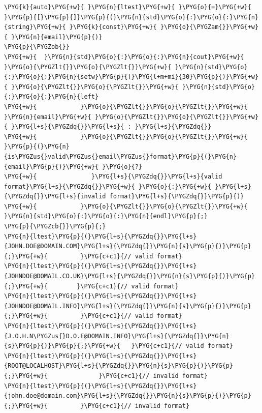 
\begin{codeblockbg}
\begin{Verbatim}[commandchars=\\\{\},breaklines=true,breakanywhere=true,fontsize=\codefont,xleftmargin=17bp]
\PYG{k}{auto}\PYG{+w}{ }\PYG{n}{ltest}\PYG{+w}{ }\PYG{o}{=}\PYG{+w}{ }\PYG{p}{[}\PYG{p}{]}\PYG{p}{(}\PYG{n}{std}\PYG{o}{:}\PYG{o}{:}\PYG{n}{string}\PYG{+w}{ }\PYG{k}{const}\PYG{+w}{ }\PYG{o}{\PYGZam{}}\PYG{+w}{ }\PYG{n}{email}\PYG{p}{)}
\PYG{p}{\PYGZob{}}
\PYG{+w}{  }\PYG{n}{std}\PYG{o}{:}\PYG{o}{:}\PYG{n}{cout}\PYG{+w}{ }\PYG{o}{\PYGZlt{}}\PYG{o}{\PYGZlt{}}\PYG{+w}{ }\PYG{n}{std}\PYG{o}{:}\PYG{o}{:}\PYG{n}{setw}\PYG{p}{(}\PYG{l+m+mi}{30}\PYG{p}{)}\PYG{+w}{ }\PYG{o}{\PYGZlt{}}\PYG{o}{\PYGZlt{}}\PYG{+w}{ }\PYG{n}{std}\PYG{o}{:}\PYG{o}{:}\PYG{n}{left}
\PYG{+w}{            }\PYG{o}{\PYGZlt{}}\PYG{o}{\PYGZlt{}}\PYG{+w}{ }\PYG{n}{email}\PYG{+w}{ }\PYG{o}{\PYGZlt{}}\PYG{o}{\PYGZlt{}}\PYG{+w}{ }\PYG{l+s}{\PYGZdq{}}\PYG{l+s}{ : }\PYG{l+s}{\PYGZdq{}}
\PYG{+w}{            }\PYG{o}{\PYGZlt{}}\PYG{o}{\PYGZlt{}}\PYG{+w}{ }\PYG{p}{(}\PYG{n}{is\PYGZus{}valid\PYGZus{}email\PYGZus{}format}\PYG{p}{(}\PYG{n}{email}\PYG{p}{)}\PYG{+w}{ }\PYG{o}{?}
\PYG{+w}{               }\PYG{l+s}{\PYGZdq{}}\PYG{l+s}{valid format}\PYG{l+s}{\PYGZdq{}}\PYG{+w}{ }\PYG{o}{:}\PYG{+w}{ }\PYG{l+s}{\PYGZdq{}}\PYG{l+s}{invalid format}\PYG{l+s}{\PYGZdq{}}\PYG{p}{)}
\PYG{+w}{            }\PYG{o}{\PYGZlt{}}\PYG{o}{\PYGZlt{}}\PYG{+w}{ }\PYG{n}{std}\PYG{o}{:}\PYG{o}{:}\PYG{n}{endl}\PYG{p}{;}
\PYG{p}{\PYGZcb{}}\PYG{p}{;}
\PYG{n}{ltest}\PYG{p}{(}\PYG{l+s}{\PYGZdq{}}\PYG{l+s}{JOHN.DOE@DOMAIN.COM}\PYG{l+s}{\PYGZdq{}}\PYG{n}{s}\PYG{p}{)}\PYG{p}{;}\PYG{+w}{         }\PYG{c+c1}{// valid format}
\PYG{n}{ltest}\PYG{p}{(}\PYG{l+s}{\PYGZdq{}}\PYG{l+s}{JOHNDOE@DOMAIL.CO.UK}\PYG{l+s}{\PYGZdq{}}\PYG{n}{s}\PYG{p}{)}\PYG{p}{;}\PYG{+w}{        }\PYG{c+c1}{// valid format}
\PYG{n}{ltest}\PYG{p}{(}\PYG{l+s}{\PYGZdq{}}\PYG{l+s}{JOHNDOE@DOMAIL.INFO}\PYG{l+s}{\PYGZdq{}}\PYG{n}{s}\PYG{p}{)}\PYG{p}{;}\PYG{+w}{         }\PYG{c+c1}{// valid format}
\PYG{n}{ltest}\PYG{p}{(}\PYG{l+s}{\PYGZdq{}}\PYG{l+s}{J.O.H.N\PYGZus{}D.O.E@DOMAIN.INFO}\PYG{l+s}{\PYGZdq{}}\PYG{n}{s}\PYG{p}{)}\PYG{p}{;}\PYG{+w}{   }\PYG{c+c1}{// valid format}
\PYG{n}{ltest}\PYG{p}{(}\PYG{l+s}{\PYGZdq{}}\PYG{l+s}{ROOT@LOCALHOST}\PYG{l+s}{\PYGZdq{}}\PYG{n}{s}\PYG{p}{)}\PYG{p}{;}\PYG{+w}{              }\PYG{c+c1}{// invalid format}
\PYG{n}{ltest}\PYG{p}{(}\PYG{l+s}{\PYGZdq{}}\PYG{l+s}{john.doe@domain.com}\PYG{l+s}{\PYGZdq{}}\PYG{n}{s}\PYG{p}{)}\PYG{p}{;}\PYG{+w}{         }\PYG{c+c1}{// invalid format}
\end{Verbatim}
\end{codeblockbg}


